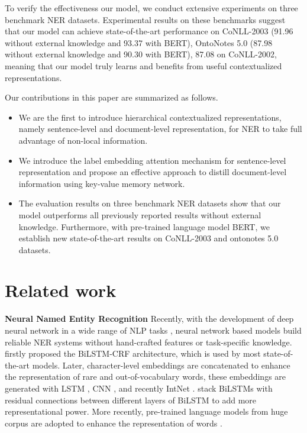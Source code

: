 \documentclass[letterpaper]{article} \usepackage{aaai20}  \usepackage{times}  \usepackage{helvet} \usepackage{courier}  \usepackage[hyphens]{url}  \usepackage{graphicx} \urlstyle{rm} \def\UrlFont{\rm}  \usepackage{graphicx}  \frenchspacing  \setlength{\pdfpagewidth}{8.5in}  \setlength{\pdfpageheight}{11in}
\begin{document}
To verify the effectiveness our model, we conduct extensive experiments on three benchmark NER datasets.
Experimental results on these benchmarks suggest that our model can achieve state-of-the-art performance on CoNLL-2003 (91.96  without external knowledge and 93.37  with BERT), OntoNotes 5.0 (87.98  without external knowledge and 90.30  with BERT), 87.08  on CoNLL-2002, meaning that our model truly learns and benefits from useful contextualized representations.

Our contributions in this paper are summarized as follows.
\begin{itemize}
    \item We are the first to introduce hierarchical contextualized representations, namely sentence-level and document-level representation, for NER to take full advantage of non-local information.
    \item We introduce the label embedding attention mechanism for sentence-level representation and propose an effective approach to distill document-level information using key-value memory network.
    \item The evaluation results on three benchmark NER datasets show that our model outperforms all previously reported results without external knowledge. Furthermore, with pre-trained language model BERT, we establish new state-of-the-art results on CoNLL-2003 and ontonotes 5.0 datasets.
\end{itemize} 

\section{Related work}

\noindent\textbf{Neural Named Entity Recognition} 
Recently, with the development of deep neural network in a wide range of NLP tasks \cite{he2018syntax,he2019syntax,zhou2019head,xiao2019lattice,zhang2019dcmn+,zhang2019semantics}, neural network based models build 
reliable NER systems without hand-crafted features
or task-specific knowledge.
\cite{huang2015bidirectional} firstly proposed the BiLSTM-CRF architecture, which is used by most state-of-the-art models.
Later, character-level embeddings are concatenated to enhance the representation of rare and out-of-vocabulary words, these embeddings are generated with LSTM \cite{lample2016neural}, CNN \cite{ma2016end}, and recently IntNet \cite{xin2018learning}.
\cite{tran-etal-2017-named} stack BiLSTMs with residual connections between different layers of BiLSTM to add more representational
power. 
More recently, pre-trained language models from huge corpus are  adopted to enhance the representation of words \cite{peters2018deep,akbik2019pooled,devlin2018bert}. 
\end{document}
